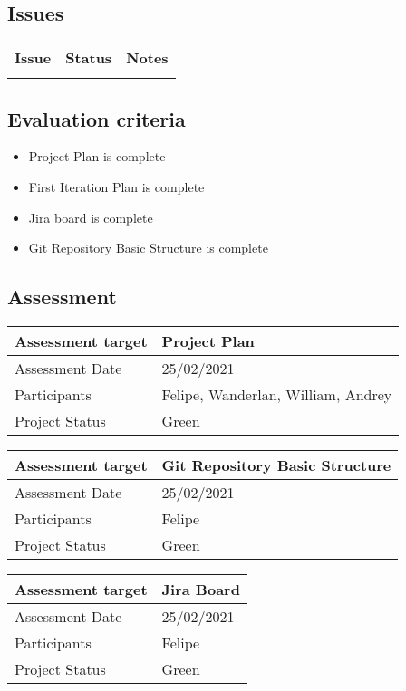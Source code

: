 \subsection*{Issues}

\noindent\begin{tabular}{|l|l|l|}
\hline
Issue & Status & Notes \\
\hline
 &  & \\
\hline
\end{tabular}

\subsection*{Evaluation criteria}

\begin{itemize}
	\item Project Plan is complete
	\item	First Iteration Plan is complete
	\item Jira board is complete
	\item Git Repository Basic Structure is complete
\end{itemize}

\subsection*{Assessment}

\noindent\begin{tabular}{|l|l|}
\hline
Assessment target & Project Plan\\\hline
Assessment Date & 25/02/2021\\\hline
Participants & Felipe, Wanderlan, William, Andrey \\\hline
Project Status & Green\\\hline
\end{tabular}

\noindent\begin{tabular}{|l|l|}
\hline
Assessment target & Git Repository Basic Structure\\\hline
Assessment Date & 25/02/2021\\\hline
Participants & Felipe \\\hline
Project Status & Green\\\hline
\end{tabular}

\noindent\begin{tabular}{|l|l|}
\hline
Assessment target & Jira Board\\\hline
Assessment Date & 25/02/2021\\\hline
Participants & Felipe \\\hline
Project Status & Green\\\hline
\end{tabular}

